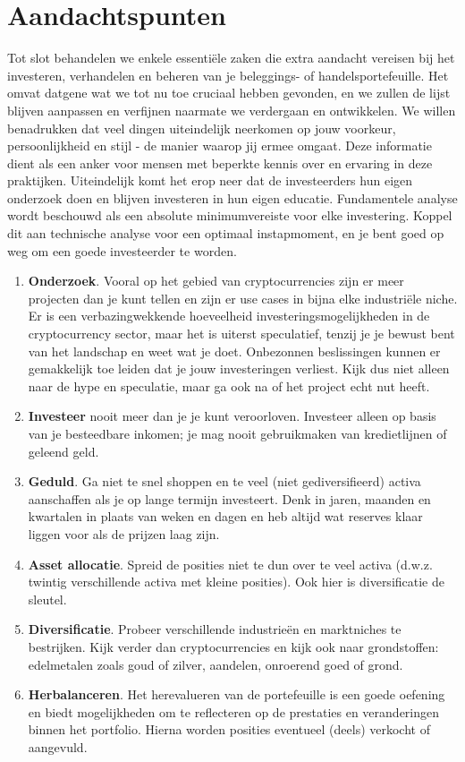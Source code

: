 \section{Aandachtspunten}
Tot slot behandelen we enkele essenti\"ele zaken die extra aandacht vereisen bij het investeren, verhandelen en beheren van je beleggings- of handelsportefeuille. Het omvat datgene wat we tot nu toe cruciaal hebben gevonden, en we zullen de lijst blijven aanpassen en verfijnen naarmate we verdergaan en ontwikkelen. We willen benadrukken dat veel dingen uiteindelijk neerkomen op jouw voorkeur, persoonlijkheid en stijl - de manier waarop jij ermee omgaat. Deze informatie dient als een anker voor mensen met beperkte kennis over en ervaring in deze praktijken. Uiteindelijk komt het erop neer dat de investeerders hun eigen onderzoek doen en blijven investeren in hun eigen educatie. Fundamentele analyse wordt beschouwd als een absolute minimumvereiste voor elke investering. Koppel dit aan technische analyse voor een optimaal instapmoment, en je bent goed op weg om een goede investeerder te worden.

\begin{enumerate}[label=(\alph*)]
    \setlength\itemsep{0em}
     \item \textbf{Onderzoek}. Vooral op het gebied van cryptocurrencies zijn er meer projecten dan je kunt tellen en zijn er use cases in bijna elke industri\"ele niche. Er is een verbazingwekkende hoeveelheid investeringsmogelijkheden in de cryptocurrency sector, maar het is uiterst speculatief, tenzij je je bewust bent van het landschap en weet wat je doet. Onbezonnen beslissingen kunnen er gemakkelijk toe leiden dat je jouw investeringen verliest. Kijk dus niet alleen naar de hype en speculatie, maar ga ook na of het project echt nut heeft.
    \item \textbf{Investeer} nooit meer dan je je kunt veroorloven. Investeer alleen op basis van je besteedbare inkomen; je mag nooit gebruikmaken van kredietlijnen of geleend geld.
    \item \textbf{Geduld}. Ga niet te snel shoppen en te veel (niet gediversifieerd) activa aanschaffen als je op lange termijn investeert. Denk in jaren, maanden en kwartalen in plaats van weken en dagen en heb altijd wat reserves klaar liggen voor als de prijzen laag zijn.
    \item \textbf{Asset allocatie}. Spreid de posities niet te dun over te veel activa (d.w.z. twintig verschillende activa met kleine posities). Ook hier is diversificatie de sleutel.
    \item \textbf{Diversificatie}. Probeer verschillende industrie\"en en marktniches te bestrijken. Kijk verder dan cryptocurrencies en kijk ook naar grondstoffen: edelmetalen zoals goud of zilver, aandelen, onroerend goed of grond.
    \item \textbf{Herbalanceren}. Het herevalueren van de portefeuille is een goede oefening en biedt mogelijkheden om te reflecteren op de prestaties en veranderingen binnen het portfolio. Hierna worden posities eventueel (deels) verkocht of aangevuld. 
\end{enumerate}
